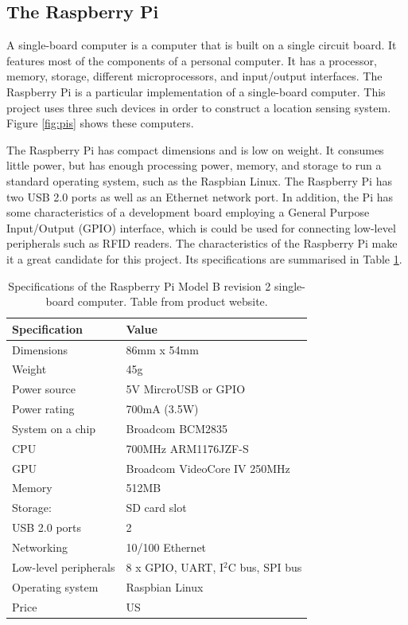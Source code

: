 \subsection{The Raspberry Pi}

A single-board computer is a computer that is built on a single circuit board. It features most of the components of a personal computer. It has a processor, memory, storage, different microprocessors, and input/output interfaces. The Raspberry Pi is a particular implementation of a single-board computer. This project uses three such devices in order to construct a location sensing system. Figure \ref{fig:pis} shows these computers.

The Raspberry Pi has compact dimensions and is low on weight. It consumes little power, but has enough processing power, memory, and storage to run a standard operating system, such as the Raspbian Linux. The Raspberry Pi has two USB 2.0 ports as well as an Ethernet network port. In addition, the Pi has some characteristics of a development board employing a General Purpose Input/Output (GPIO) interface, which is could be used for connecting low-level peripherals such as RFID readers. The characteristics of the Raspberry Pi make it a great candidate for this project. Its specifications are summarised in Table \ref{tbl:pi}.

\begin{table}[h]
	\centering
	\begin{tabular}{ | m{4cm} || m{6cm} | }
		\hline
		\textbf{Specification}	& \textbf{Value} \\ \hline
		Dimensions				& 86mm x 54mm \\ \hline
		Weight					& 45g \\ \hline
		Power source			& 5V MircroUSB or GPIO \\ \hline
		Power rating			& 700mA (3.5W) \\ \hline
		System on a chip		& Broadcom BCM2835 \\ \hline
		CPU						& 700MHz ARM1176JZF-S \\ \hline
		GPU						& Broadcom VideoCore IV 250MHz \\ \hline
		Memory					& 512MB \\ \hline
		Storage:				& SD card slot \\ \hline
		USB	2.0 ports			& 2 \\ \hline
		Networking				& 10/100 Ethernet \\ \hline
		Low-level peripherals	& 8 x GPIO, UART, I$^{2}$C bus, SPI bus \\ \hline
		Operating system		& Raspbian Linux \\ \hline
		Price					& US \textdollar 35 \\ \hline
	\end{tabular}
	\caption{Specifications of the Raspberry Pi Model B revision 2 single-board computer. Table from product website\protect\footnotemark.}
	\label{tbl:pi}
\end{table}

